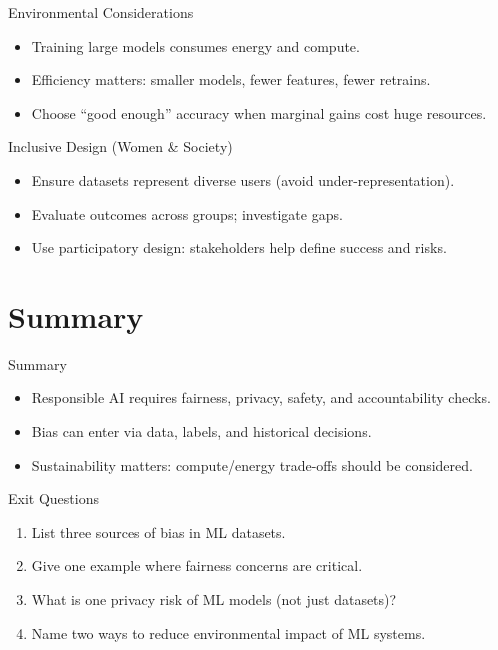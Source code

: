 \documentclass[aspectratio=169]{beamer}
\begin{document}
\begin{frame}{Environmental Considerations}
  \begin{itemize}[<+->]
    \item Training large models consumes energy and compute.
    \item Efficiency matters: smaller models, fewer features, fewer retrains.
    \item Choose ``good enough'' accuracy when marginal gains cost huge resources.
  \end{itemize}
\end{frame}

\begin{frame}{Inclusive Design (Women \& Society)}
  \begin{itemize}[<+->]
    \item Ensure datasets represent diverse users (avoid under-representation).
    \item Evaluate outcomes across groups; investigate gaps.
    \item Use participatory design: stakeholders help define success and risks.
  \end{itemize}
\end{frame}

\section{Summary}
\label{sec:summary}

\begin{frame}{Summary}
  \begin{itemize}
    \item Responsible AI requires fairness, privacy, safety, and accountability checks.
    \item Bias can enter via data, labels, and historical decisions.
    \item Sustainability matters: compute/energy trade-offs should be considered.
  \end{itemize}
  \slidesources{\AIMLUnitVSources}
\end{frame}

\begin{frame}{Exit Questions}
  \begin{enumerate}
    \item List three sources of bias in ML datasets.
    \item Give one example where fairness concerns are critical.
    \item What is one privacy risk of ML models (not just datasets)?
    \item Name two ways to reduce environmental impact of ML systems.
  \end{enumerate}
\end{frame}
\end{document}
